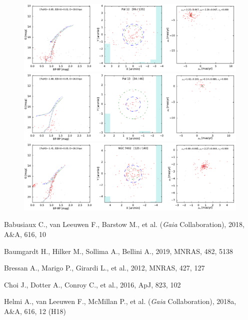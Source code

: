 \documentclass[usenatbib]{mnras}
\newcommand{\Gaia}{\textit{Gaia}\xspace}
\begin{document}
\clearpage\begin{figure}
\contcaption{}
\includegraphics{figs/Pal_12.pdf}
\includegraphics{figs/Pal_13.pdf}
\includegraphics{figs/NGC_7492.pdf}
\end{figure}

\clearpage
\begin{thebibliography}{}

Babusiaux C., van Leeuwen F., Barstow M., et al. (\Gaia Collaboration), 2018, A\&A, 616, 10

Baumgardt H., Hilker M., Sollima A., Bellini A., 2019, MNRAS, 482, 5138

Bressan A., Marigo P., Girardi L., et al., 2012, MNRAS, 427, 127

Choi J., Dotter A., Conroy C., et al., 2016, ApJ, 823, 102

Helmi A., van Leeuwen F., McMillan P., et al. (\Gaia Collaboration), 2018a, A\&A, 616, 12 (H18)

\end{thebibliography}
\end{document}
